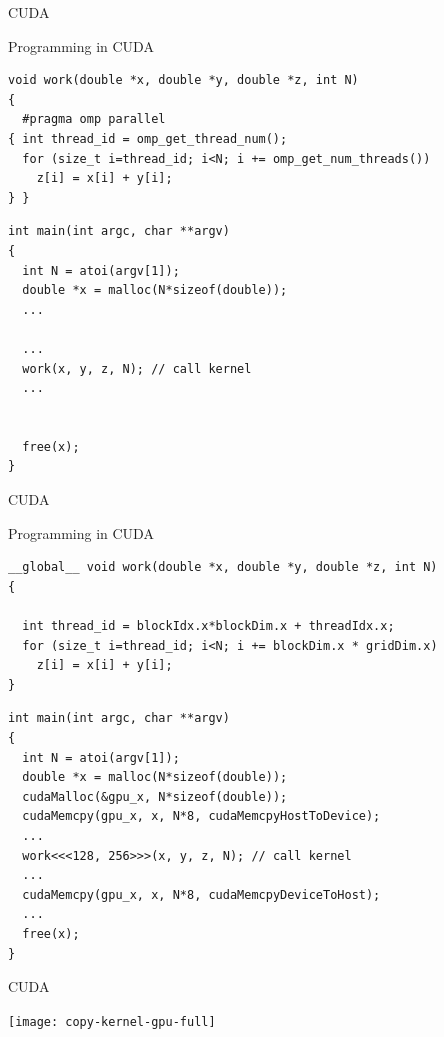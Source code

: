 \begin{frame}[fragile]{CUDA}
 
 \begin{block}{Programming in CUDA}
  \begin{lstlisting}
void work(double *x, double *y, double *z, int N)
{
  #pragma omp parallel
{ int thread_id = omp_get_thread_num();
  for (size_t i=thread_id; i<N; i += omp_get_num_threads())
    z[i] = x[i] + y[i];
} }
  \end{lstlisting}
  \begin{lstlisting}
int main(int argc, char **argv)
{
  int N = atoi(argv[1]);
  double *x = malloc(N*sizeof(double));
  ...
  
  ...
  work(x, y, z, N); // call kernel
  ...
 
 
  free(x);
}  
  \end{lstlisting}
 \end{block}
\end{frame}




\begin{frame}[fragile]{CUDA}
 
 \begin{block}{Programming in CUDA}
  \begin{lstlisting}
__global__ void work(double *x, double *y, double *z, int N)
{

  int thread_id = blockIdx.x*blockDim.x + threadIdx.x;
  for (size_t i=thread_id; i<N; i += blockDim.x * gridDim.x)
    z[i] = x[i] + y[i];
}
  \end{lstlisting}
  \begin{lstlisting}
int main(int argc, char **argv)
{
  int N = atoi(argv[1]);
  double *x = malloc(N*sizeof(double));
  cudaMalloc(&gpu_x, N*sizeof(double));
  cudaMemcpy(gpu_x, x, N*8, cudaMemcpyHostToDevice);
  ...
  work<<<128, 256>>>(x, y, z, N); // call kernel
  ...
  cudaMemcpy(gpu_x, x, N*8, cudaMemcpyDeviceToHost);
  ...
  free(x);
}  
  \end{lstlisting}
 \end{block}
\end{frame}


\begin{frame}[fragile]{CUDA}

 \begin{center}
  \texttt{[image: copy-kernel-gpu-full]}
 \end{center}


\end{frame}


